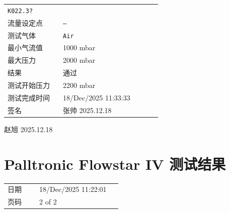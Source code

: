 \documentclass[UTF8,10pt,a4paper,fontset=fandol]{ctexart}
\newcommand{\fieldvalue}[1]{#1}
\newcommand{\handwritten}[1]{#1}
\begin{document}
\begin{tabular}{@{}p{0.32\linewidth}p{0.58\linewidth}@{}}
\fieldvalue{\texttt{K022.3?}} \\
流量设定点 &
\fieldvalue{\texttt{--}} \\
测试气体 &
\fieldvalue{\texttt{Air}} \\
最小气流值 &
\fieldvalue{1000 mbar} \\
最大压力 &
\fieldvalue{2000 mbar} \\
结果 &
\fieldvalue{通过} \\
测试开始压力 &
\fieldvalue{2200 mbar} \\
测试完成时间 &
\fieldvalue{18/Dec/2025 11:33:33} \\
签名 &
\fieldvalue{\handwritten{张帅 2025.12.18}} \\
\end{tabular}

\handwritten{赵旭 2025.12.18}

\section*{Palltronic Flowstar IV 测试结果}

\begin{tabular}{@{}p{0.25\linewidth}p{0.65\linewidth}@{}}
日期 &
\fieldvalue{18/Dec/2025 11:22:01} \\
页码 &
\fieldvalue{2 of 2} \\
\end{tabular}

\vspace{1em}
\end{document}
